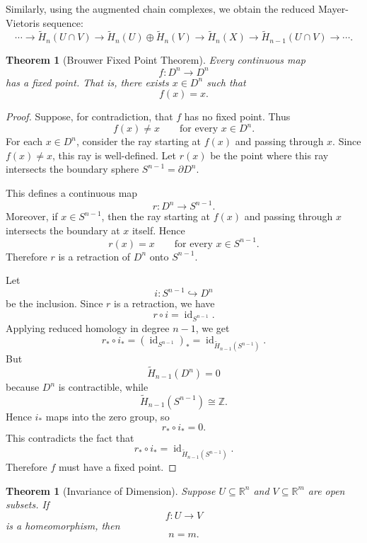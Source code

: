 \documentclass[11pt,a4paper]{article}
\theoremstyle{definition}
\theoremstyle{plain}
\newtheorem{theorem}[definition]{Theorem}
\theoremstyle{remark}
\newcommand{\1}{\mathbbm{1}}
\begin{document}
Similarly, using the augmented chain complexes, we obtain the reduced Mayer-Vietoris sequence:
\[
    \cdots
    \to
    \widetilde H_n(U\cap V)
    \to
    \widetilde H_n(U)\oplus \widetilde H_n(V)
    \to
    \widetilde H_n(X)
    \to
    \widetilde H_{n-1}(U\cap V)
    \to
    \cdots.
\]

\begin{theorem}[Brouwer Fixed Point Theorem]
    Every continuous map
    \[
        f : D^n \to D^n
    \]
    has a fixed point. That is, there exists $x \in D^n$ such that
    \[
        f(x)=x.
    \]
\end{theorem}

\begin{proof}
    Suppose, for contradiction, that $f$ has no fixed point. Thus
    \[
        f(x) \neq x
        \qquad
        \text{for every } x \in D^n.
    \]
    For each $x \in D^n$, consider the ray starting at $f(x)$ and passing through $x$. Since $f(x)\neq x$, this ray is well-defined. Let $r(x)$ be the point where this ray intersects the boundary sphere $S^{n-1} = \partial D^n$.

    This defines a continuous map
    \[
        r : D^n \to S^{n-1}.
    \]
    Moreover, if $x \in S^{n-1}$, then the ray starting at $f(x)$ and passing through $x$ intersects the boundary at $x$ itself. Hence
    \[
        r(x)=x
        \qquad
        \text{for every } x\in S^{n-1}.
    \]
    Therefore $r$ is a retraction of $D^n$ onto $S^{n-1}$.

    Let
    \[
        i : S^{n-1} \hookrightarrow D^n
    \]
    be the inclusion. Since $r$ is a retraction, we have
    \[
        r\circ i = \operatorname{id}_{S^{n-1}}.
    \]
    Applying reduced homology in degree $n-1$, we get
    \[
        r_* \circ i_*
        =
        (\operatorname{id}_{S^{n-1}})_*
        =
        \operatorname{id}_{\widetilde H_{n-1}(S^{n-1})}.
    \]
    But
    \[
        \widetilde H_{n-1}(D^n)=0
    \]
    because $D^n$ is contractible, while
    \[
        \widetilde H_{n-1}(S^{n-1})\cong \mathbb Z.
    \]
    Hence $i_*$ maps into the zero group, so
    \[
        r_* \circ i_* = 0.
    \]
    This contradicts the fact that
    \[
        r_* \circ i_* = \operatorname{id}_{\widetilde H_{n-1}(S^{n-1})}.
    \]
    Therefore $f$ must have a fixed point.
\end{proof}

\begin{theorem}[Invariance of Dimension]
    Suppose $U \subseteq \mathbb R^n$ and $V \subseteq \mathbb R^m$ are open subsets. If
    \[
        f : U \to V
    \]
    is a homeomorphism, then
    \[
        n=m.
    \]
\end{theorem}
\end{document}
